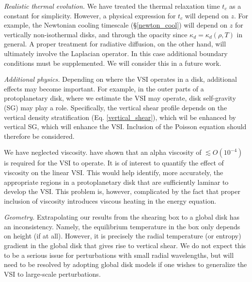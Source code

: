 \emph{Realistic thermal evolution.} We have treated the thermal
relaxation time $t_c$ as a constant for simplicity. However, a
physical expression for $t_c$ will depend on 
$z$. For example, the Newtonian cooling timescale
(\S\ref{newton_cool}) will depend on $z$ for vertically non-isothermal
disks, and through the opacity since 
$\kappa_d=\kappa_d(\rho,T)$ in general. 
A proper treatment for radiative diffusion, on the other hand, will
ultimately involve the Laplacian operator. In this case additional
boundary conditions must be supplemented. We will consider this in a
future work.  


\emph{Additional physics.} Depending on where the VSI operates in a
disk, additional effects may become important. For example, in the
outer parts of a protoplanetary disk, where we estimate the VSI may
operate, disk self-gravity (SG) may play a role. Specifically, the vertical
shear profile depends on the vertical density stratification
(Eq. \ref{vertical_shear}), which wil be enhanced by vertical SG,
which will enhance the VSI. Inclusion of the Poisson equation should
therefore be considered. 

We have neglected viscosity. \cite{nelson13} have shown that an
alpha viscosity of $\lesssim O(10^{-4})$ is required for the VSI to
operate. It is of interest to quantify the effect of viscosity
on the linear VSI. This would help identify, more accurately, the
appropriate regions in a protoplanetary disk that are sufficiently
laminar to develop the VSI.  This problem is, however, complicated by
the fact that proper inclusion of viscosity introduces viscous heating
in the energy equation. 


\emph{Geometry.} Extrapolating our results from the shearing box to a global disk  
has an inconsistency. Namely, the equilibrium temperature in the
box only depends on height (if at all). However, it is precisely the
radial temperature (or entropy) gradient in the global disk that
gives rise to vertical shear. We do not expect this to be a serious issue for 
perturbations with small radial wavelengths, 
but will need to be resolved by adopting global disk models  
if one wishes to generalize the VSI to large-scale perturbations. 





